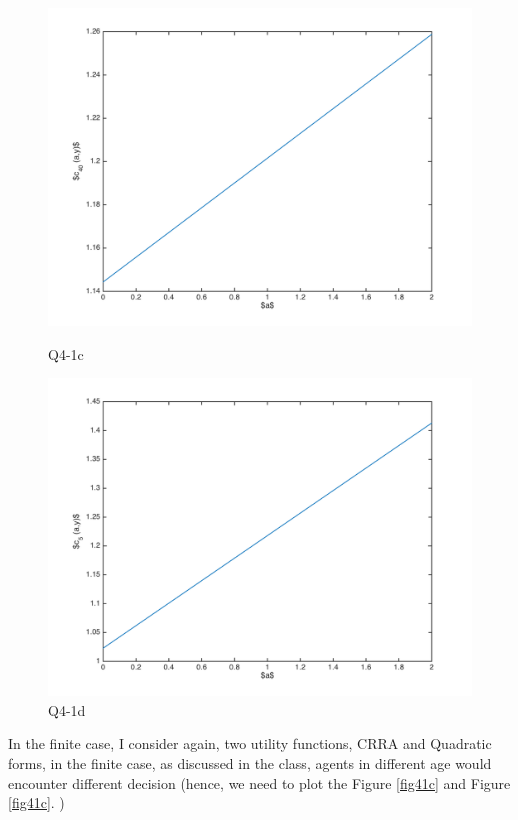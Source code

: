 \documentclass{article}[a4paper]
\begin{document}
\begin{figure}[htbp]
\centering
\begin{minipage}[t]{0.48\textwidth}
\includegraphics[width=\textwidth]{img/41c.png}
\caption{Q4-1c} \label{fig41c}
\end{minipage}
\begin{minipage}[t]{0.48\textwidth}
\centering
\includegraphics[width=\textwidth]{img/41d.png}
\caption{Q4-1d} \label{fig41d}
\end{minipage}
\end{figure}


In the finite case, I consider again, two utility functions, CRRA and Quadratic forms, in the finite case, as discussed in the class, agents in different age would encounter different decision (hence, we need to plot the Figure \ref{fig41c} and Figure \ref{fig41c}. ) 
\end{document}
